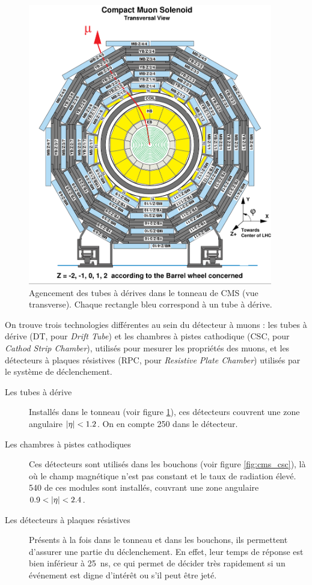 \begin{figure}[p] \centering
  \includegraphics[width=0.95\textwidth]{chapitre2/figs/CMS_transverse_view.pdf}
  \caption{Agencement des tubes à dérives dans le tonneau de CMS (vue transverse). Chaque rectangle bleu correspond à un tube à dérive.}
  \label{fig:cms_dt}
\end{figure}

On trouve trois technologies différentes au sein du détecteur à muons : les tubes à dérive (DT, pour \emph{Drift Tube}) et les chambres à pistes cathodique (CSC, pour \emph{Cathod Strip Chamber}), utilisés pour mesurer les propriétés des muons, et les détecteurs à plaques résistives (RPC, pour \emph{Resistive Plate Chamber}) utilisés par le système de déclenchement.

\begin{description}
  \item[Les tubes à dérive] Installés dans le tonneau (voir figure \ref{fig:cms_dt}), ces détecteurs couvrent une zone angulaire $\lvert \eta \rvert < 1.2$. On en compte 250 dans le détecteur.
  \item[Les chambres à pistes cathodiques] Ces détecteurs sont utilisés dans les bouchons (voir figure \ref{fig:cms_csc}), là où le champ magnétique n'est pas constant et le taux de radiation élevé. 540 de ces modules sont installés, couvrant une zone angulaire $\num{0.9} < \lvert \eta \rvert < \num{2.4}$.
  \item[Les détecteurs à plaques résistives] Présents à la fois dans le tonneau et dans les bouchons, ils permettent d'assurer une partie du déclenchement. En effet, leur temps de réponse est bien inférieur à \SI{25}{\ns}, ce qui permet de décider très rapidement si un événement est digne d’intérêt ou s'il peut être jeté.
\end{description}

